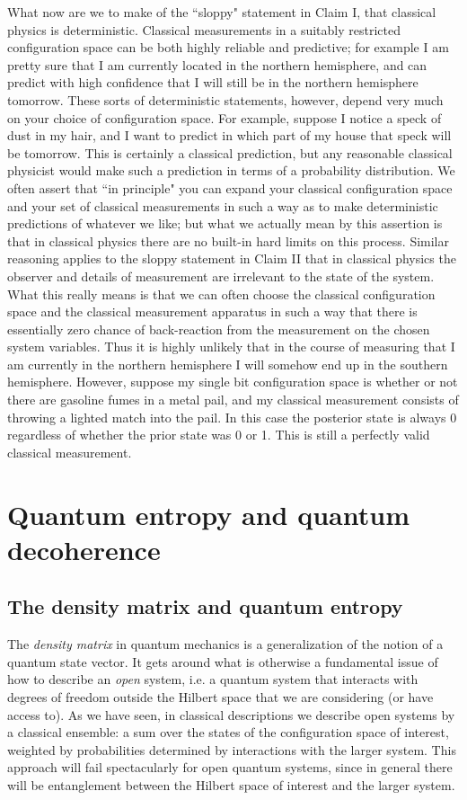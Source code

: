 \documentclass[a4paper,11pt]{article}
\begin{document}
What now are we to make of the ``sloppy" statement in Claim I, that classical physics is deterministic.
Classical measurements in a suitably restricted configuration space can be both highly reliable and predictive; for example I am pretty
sure that I am currently located in the northern hemisphere, and can predict with high confidence that I will still be in the
northern hemisphere tomorrow. These sorts of deterministic statements, however, depend very much on your choice of
configuration space. For example, suppose I notice a speck of dust in my hair, and I want to predict
in which part of my house that speck will be tomorrow. This is certainly a classical prediction, but any reasonable classical
physicist would make such a prediction in terms of a probability distribution. We often assert that ``in principle" you can
expand your classical configuration space and your set of classical measurements in such a way as to make deterministic 
predictions of whatever we like; but what we actually mean by this assertion is that in classical physics there are no built-in
hard limits on this process. Similar reasoning applies to the sloppy statement in Claim II that
in classical physics the observer and details of measurement are irrelevant to the state of the system. What this
really means is that we can often choose the classical configuration space and the classical measurement apparatus in such
a way that there is essentially zero chance of back-reaction from the measurement on the chosen system variables.
Thus it is highly unlikely that in the course of measuring that I am currently in the northern hemisphere I will somehow
end up in the southern hemisphere. However, suppose my single bit configuration space is whether or not there are
gasoline fumes in a metal pail, and my classical measurement consists of throwing a lighted match into the pail. In this
case the posterior state is always 0 regardless of whether the prior state was 0 or 1. This is still a perfectly valid classical
measurement.

\section{Quantum entropy and quantum decoherence}\label{sec:five}

\subsection{The density matrix and quantum entropy}
The {\it density matrix} in quantum mechanics is a generalization of the notion of a quantum state vector. It gets around what is otherwise a fundamental
issue of how to describe an {\it open} system, i.e. a quantum system that interacts with degrees of freedom outside the Hilbert space that we are considering (or have
access to). As we have seen, in classical descriptions we describe open systems by a classical ensemble: a sum over the states of the configuration space of interest,
weighted by probabilities determined by interactions with the larger system. This approach will fail spectacularly for open quantum systems, since in general there
will be entanglement between the Hilbert space of interest and the larger system. 
\end{document}
